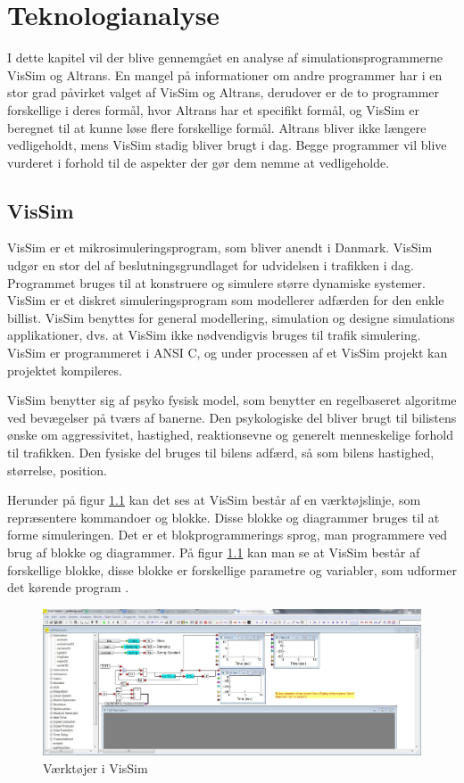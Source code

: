 \chapter{Teknologianalyse}\label{Teknologianalyse}
I dette kapitel vil der blive gennemgået en analyse af simulationsprogrammerne VisSim og Altrans. En mangel på informationer om andre programmer har i en stor grad påvirket valget af VisSim og Altrans, derudover er de to programmer forskellige i deres formål, hvor Altrans har et specifikt formål, og VisSim er beregnet til at kunne løse flere forskellige formål. Altrans bliver ikke længere vedligeholdt, mens VisSim stadig bliver brugt i dag. Begge programmer vil blive vurderet i forhold til de aspekter der gør dem nemme at vedligeholde.

\section{VisSim}
VisSim er et mikrosimuleringsprogram, som bliver anendt i Danmark. VisSim udgør en stor del af beslutningsgrundlaget for udvidelsen i trafikken i dag. Programmet bruges til at konstruere og simulere større dynamiske systemer. VisSim er et diskret simuleringsprogram som modellerer adfærden for den enkle billist. VisSim benyttes for general modellering, simulation og designe simulations applikationer, dvs. at VisSim ikke nødvendigvis bruges til trafik simulering. VisSim er programmeret i ANSI C, og under processen af et VisSim projekt kan projektet kompileres.

VisSim benytter sig af psyko fysisk model, som benytter en regelbaseret algoritme ved bevægelser på tværs af banerne. Den psykologiske del bliver brugt til bilistens ønske om aggressivitet, hastighed, reaktionsevne og generelt menneskelige forhold til trafikken. Den fysiske del bruges til bilens adfærd, så som bilens hastighed, størrelse, position. 

Herunder på figur \ref{vissim} kan det ses at VisSim består af en værktøjslinje, som repræsentere kommandoer og blokke. Disse blokke og diagrammer bruges til at forme simuleringen. Det er et blokprogrammerings sprog, man programmere ved brug af blokke og diagrammer. På figur \ref{vissim} kan man se at VisSim består af forskellige blokke, disse blokke er forskellige parametre og variabler, som udformer det kørende program \cite{vissimfunker}.

\begin{figure}
\begin{center}
\includegraphics[width=1.2\textwidth]{Pictures/Teknologianalyse/vissimfunker.jpg}
\end{center}
\caption{Værktøjer i VisSim}
\label{vissim}
\end{figure}

